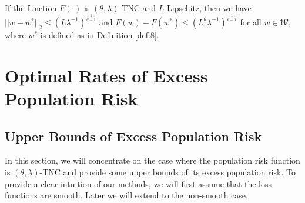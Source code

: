 \documentclass[12pt]{alt2022} %
\begin{document}
    \iffalse
    The following example is a population risk function that satisfies TNC. 
 \paragraph{Example of TNC \citep{liu2018fast}} Consider the quadratic problem with $\ell_p$-norm regularization
 \begin{equation*}
     \min_{w\in \mathcal{W}} F(w)=   
       w^T\mathbb{E}_x[A(x)]w+w^T\mathbb{E}_x[b(x)]+c+\lambda \|w\|_p^p,
     \end{equation*}
         where $c$ is a constant, $\mathbb{E}_x[A(x)]$ is a positive semi-definite matrix, $\mathcal{W}$ is a bounded polyhedron and $p\geq 2$. Then $F(\cdot)$ is TNC with $\theta=p$. 
 \fi 
	\begin{lemma}\label{lemma:3}
	If the function $F(\cdot)$ is $(\theta, \lambda)$-TNC and  $L$-Lipschitz, then we have $||w-w^*||_2\leq(L\lambda^{-1})^{\frac{1}{\theta-1}}$  and $F(w)-F(w^*)\leq (L^{\theta}\lambda^{-1})^{\frac{1}{\theta-1}}$ for all $ w\in\mathcal{W}$, where $w^*$ is defined as in Definition \ref{def:8}.
	\end{lemma}
	\section{Optimal Rates of Excess Population Risk}
	\subsection{Upper Bounds of Excess Population Risk}
	In this section, we will concentrate on the case where the population risk function is $(\theta, \lambda)$-TNC and provide some upper bounds of its excess population risk. To provide a clear intuition of our methods, we will first assume that the loss functions are smooth. Later we will extend to the non-smooth case. 
	
\end{document}
